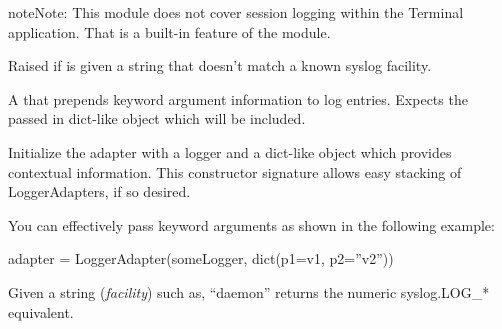 \documentclass[letterpaper,10pt,openany]{sphinxmanual}
\begin{document}
\begin{notice}{note}{Note:}
This module does not cover session logging within the Terminal application.
That is a built-in feature of the {\hyperref[Developer/termio:module-termio]{}} module.
\end{notice}

\begin{fulllineitems}
\label{Developer/log:gateone.core.log.UnknownFacility}
Raised if {\hyperref[Developer/log:gateone.core.log.string_to_syslog_facility]{}} is given a string that doesn't match
a known syslog facility.

\end{fulllineitems}


\begin{fulllineitems}
\label{Developer/log:gateone.core.log.JSONAdapter}
A  that prepends keyword argument information to log
entries.  Expects the passed in dict-like object which will be included.

Initialize the adapter with a logger and a dict-like object which
provides contextual information. This constructor signature allows
easy stacking of LoggerAdapters, if so desired.

You can effectively pass keyword arguments as shown in the
following example:

adapter = LoggerAdapter(someLogger, dict(p1=v1, p2=''v2''))

\end{fulllineitems}


\begin{fulllineitems}
\label{Developer/log:gateone.core.log.string_to_syslog_facility}
Given a string (\emph{facility}) such as, ``daemon'' returns the numeric
syslog.LOG\_* equivalent.

\end{fulllineitems}

\end{document}
